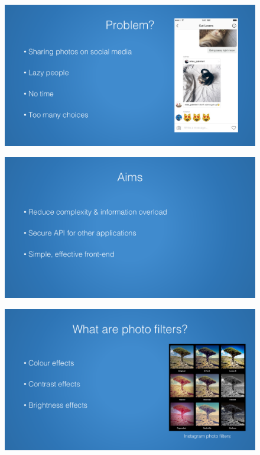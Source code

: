 \documentclass[a4paper,12pt]{report}
\begin{document}
\begin{appendices}
    \begin{figure}[h]
      \centering
      \includegraphics[width=0.9\linewidth]{presentation-2}
    \end{figure}

    \begin{figure}[h]
      \centering
      \includegraphics[width=0.9\linewidth]{presentation-3}
    \end{figure}

    \begin{figure}[h]
      \centering
      \includegraphics[width=0.9\linewidth]{presentation-4}
    \end{figure}


\end{appendices}
\end{document}
